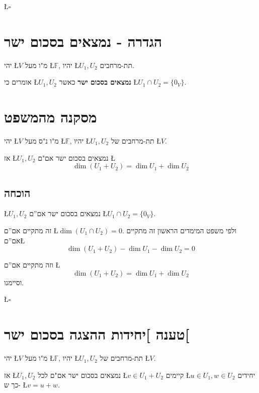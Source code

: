 \documentclass[english,hebrew]{article}
\begin{document}
\begin{flushright}
\L{$\square$}
\par\end{flushright}

\section{הגדרה - נמצאים בסכום ישר}

יהי \L{$V$} מ"ו מעל \L{$\mathbb{F}$}, יהיו \L{$U_{1},U_{2}$} תת-מרחבים.

אומרים כי \L{$U_{1},U_{2}$} \textbf{נמצאים בסכום ישר} כאשר \L{$U_{1}\cap U_{2}=\{0_{V}\}$}.

\section{מסקנה מהמשפט}

יהי \L{$V$} מ"ו נ"ס מעל \L{$\mathbb{F}$}, יהיו \L{$U_{1},U_{2}$}
תת-מרחבים של \L{$V$}.

אז \L{$U_{1},U_{2}$} נמצאים בסכום ישר אם"ם \L{%
\[
\dim(U_{1}+U_{2})=\dim U_{1}+\dim U_{2}
\]
}%

\subsection{הוכחה}

\L{$U_{1},U_{2}$} נמצאים בסכום ישר אם\textquotedblright ם \L{$U_{1}\cap U_{2}=\{0_{V}\}$}.

זה מתקיים אם\textquotedblright ם \L{$\dim(U_{1}\cap U_{2})=0$}. ולפי
משפט המימדים הראשון זה מתקיים אם\textquotedblright ם\L{%
\[
\dim(U_{1}+U_{2})-\dim U_{1}-\dim U_{2}=0
\]
}%

וזה מתקיים אם\textquotedblright ם \L{%
\[
\dim(U_{1}+U_{2})=\dim U_{1}+\dim U_{2}
\]
}%
וסיימנו.
\begin{flushright}
\L{$\square$}
\par\end{flushright}

\section{טענה {]}יחידות ההצגה בסכום ישר{[}}

יהי \L{$V$} מ"ו מעל \L{$\mathbb{F}$}, יהיו \L{$U_{1},U_{2}$} תת-מרחבים
של \L{$V$}.

אז \L{$U_{1},U_{2}$} נמצאים בסכום ישר אם"ם לכל \L{$v\in U_{1}+U_{2}$}
קיימים \L{$u\in U_{1},w\in U_{2}$} יחידים כך ש- \L{$v=u+w$}.
\end{document}
